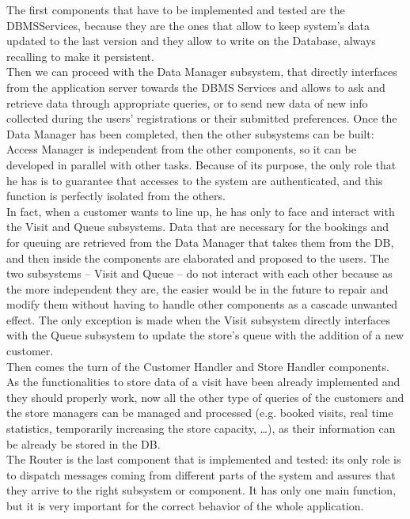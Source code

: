 \documentclass[]{article}
\begin{document}
The first components that have to be implemented and tested are the DBMSServices, because they are the ones that allow to keep system’s data updated to the last version and they allow to write on the Database, always recalling to make it persistent.\\ \newline
Then we can proceed with the Data Manager subsystem, that directly interfaces from the application server towards the DBMS Services and allows to ask and retrieve data through appropriate queries, or to send new data of new info collected during the users’ registrations or their submitted preferences.
Once the Data Manager has been completed, then the other subsystems can be built: Access Manager is independent from the other components, so it can be developed in parallel with other tasks. Because of its purpose, the only role that he has is to guarantee that accesses to the system are authenticated, and this function is perfectly isolated from the others.\\ \newline
In fact, when a customer wants to line up, he has only to face and interact with the Visit and Queue subsystems. Data that are necessary for the bookings and for queuing are retrieved from the Data Manager that takes them from the DB, and then inside the components are elaborated and proposed to the users. The two subsystems – Visit and Queue – do not interact with each other because as the more independent they are, the easier would be in the future to repair and modify them without having to handle other components as a cascade unwanted effect. The only exception is made when the Visit subsystem directly interfaces with the Queue subsystem to update the store’s queue with the addition of a new customer.\\ \newline
Then comes the turn of the Customer Handler and Store Handler components. As the functionalities to store data of a visit have been already implemented and they should properly work, now all the other type of queries of the customers and the store managers can be managed and processed (e.g. booked visits, real time statistics, temporarily increasing the store capacity, …), as their information can be already be stored in the DB.\\ \newline
The Router is the last component that is implemented and tested: its only role is to dispatch messages coming from different parts of the system and assures that they arrive to the right subsystem or component. It has only one main function, but it is very important for the correct behavior of the whole application.
\end{document}
